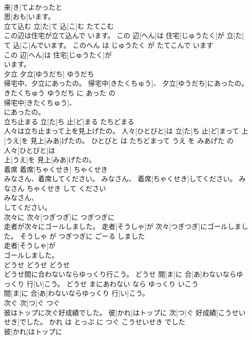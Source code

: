 \documentclass[8pt]{extreport}
\begin{document}
\begin{CJK}{UTF8}{min}
\\	来[き]てよかったと
\\	思[おも]います。			
\\	立て込む	立[た]て 込[こ]む	たてこむ	
\\	この辺は住宅が立て込んで います。	この 辺[へん]は 住宅[じゅうたく]が 立[た]て 込[こ]んでいます。	このへん は じゅうたく が たてこんで います	
\\	この 辺[へん]は 住宅[じゅうたく]が
\\	います。			
\\	夕立	夕立[ゆうだち]	ゆうだち	
\\	帰宅中、夕立にあったの。	帰宅中[きたくちゅう]、 夕立[ゆうだち]にあったの。	きたくちゅう ゆうだち に あった の	
\\	帰宅中[きたくちゅう]、
\\	にあったの。			
\\	立ち止まる	立[た]ち 止[ど]まる	たちどまる	
\\	人々は立ち止まって上を見上げたの。	人々[ひとびと]は 立[た]ち 止[ど]まって 上[うえ]を 見上[みあ]げたの。	ひとびと は たちどまって うえ を みあげた の	
\\	人々[ひとびと]は
\\	上[うえ]を 見上[みあ]げたの。			
\\	着席	着席[ちゃくせき]	ちゃくせき	
\\	みなさん、着席してください。	みなさん、 着席[ちゃくせき]してください。	みなさん ちゃくせき して ください	
\\	みなさん、
\\	してください。			
\\	次々に	次々[つぎつぎ]に	つぎつぎに	
\\	走者が次々にゴールしました。	走者[そうしゃ]が 次々[つぎつぎ]にゴールしました。	そうしゃ が つぎつぎに ごーる しました	
\\	走者[そうしゃ]が
\\	ゴールしました。			
\\	どうせ	どうせ	どうせ	
\\	どうせ間に合わないならゆっくり行こう。	どうせ 間[ま]に 合[あ]わないならゆっくり 行[い]こう。	どうせ まにあわない なら ゆっくり いこう	
\\	間[ま]に 合[あ]わないならゆっくり 行[い]こう。			
\\	次ぐ	次[つ]ぐ	つぐ	
\\	彼はトップに次ぐ好成績でした。	彼[かれ]はトップに 次[つ]ぐ 好成績[こうせいせき]でした。	かれ は とっぷ に つぐ こうせいせき でした	
\\	彼[かれ]はトップに

\end{CJK}
\end{document}
